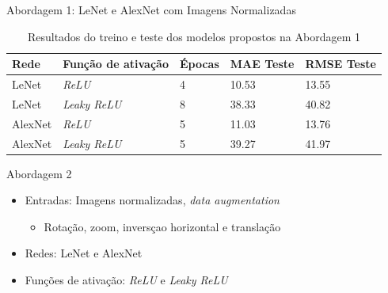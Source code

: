 \begin{frame}{\large{Abordagem 1: LeNet e AlexNet com Imagens Normalizadas}}
  \begin{table}[!ht]
		\caption{Resultados do treino e teste dos modelos propostos na Abordagem 1}
		\label{tab:results-1}
		\begin{center}
			\begin{tabular}{l l l l l}
				\toprule
				Rede & Função de ativação & Épocas & MAE Teste & RMSE Teste \\
				\midrule
				LeNet & \emph{ReLU}  & 4 & 10.53 & 13.55 \\
				LeNet & \emph{Leaky ReLU} & 8 & 38.33 & 40.82 \\
				AlexNet & \emph{ReLU}  & 5 & 11.03 & 13.76 \\
				AlexNet & \emph{Leaky ReLU} & 5 & 39.27 & 41.97 \\
				\bottomrule
			\end{tabular}
		\end{center}
	\end{table}
\end{frame}





\begin{frame}{\large{Abordagem 2}}
 \begin{itemize}
   \item Entradas: Imagens normalizadas, \alert{\emph{data augmentation}}
   \begin{itemize}
     \item Rotação, zoom, inversçao horizontal e translação
   \end{itemize}
   \item Redes: LeNet e AlexNet
   \item Funções de ativação: \emph{ReLU} e \emph{Leaky ReLU}
   \end{itemize}
\end{frame}

